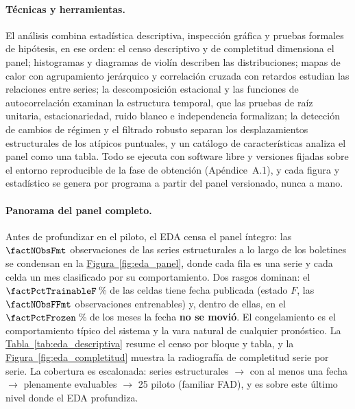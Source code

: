 \documentclass[12pt,letterpaper]{report}
\begin{document}
\paragraph{Técnicas y herramientas.} El análisis combina estadística descriptiva,
inspección gráfica y pruebas formales de hipótesis, en ese orden: el censo descriptivo y de
completitud dimensiona el panel; histogramas y diagramas de violín describen las distribuciones;
mapas de calor con agrupamiento jerárquico y correlación cruzada con retardos estudian las
relaciones entre series; la descomposición estacional y las funciones de autocorrelación examinan
la estructura temporal, que las pruebas de raíz unitaria, estacionariedad, ruido blanco e
independencia formalizan; la detección de cambios de régimen y el filtrado robusto separan los
desplazamientos estructurales de los atípicos puntuales, y un catálogo de características analiza
el panel como una tabla. Todo se ejecuta con software libre y versiones fijadas sobre el entorno
reproducible de la fase de obtención (Apéndice~A.1), y cada figura y estadístico se genera por
programa a partir del panel versionado, nunca a mano.

\paragraph{Panorama del panel completo.} Antes de profundizar en el piloto, el EDA
censa el panel íntegro: las $\factNObsFmt$ observaciones de las \factNSeriesStructural{} series estructurales
a lo largo de los \factNMonths{} boletines se condensan en la \hyperref[fig:eda_panel]{Figura~\ref*{fig:eda_panel}}, donde
cada fila es una serie y cada celda un mes clasificado por su comportamiento. Dos
rasgos dominan: el $\factPctTrainableF$\,\% de las celdas tiene fecha publicada (estado $F$, las
$\factNObsFFmt$ observaciones entrenables) y, dentro de ellas, en el $\factPctFrozen$\,\% de los meses
la fecha \textbf{no se movió}. El congelamiento es el comportamiento típico del
sistema y la vara natural de cualquier pronóstico. La \hyperref[tab:eda_descriptiva]{Tabla~\ref*{tab:eda_descriptiva}}
resume el censo por bloque y tabla, y la \hyperref[fig:eda_completitud]{Figura~\ref*{fig:eda_completitud}} muestra la
radiografía de completitud serie por serie. La cobertura es escalonada: \factNSeriesStructural{} series
estructurales $\rightarrow$ \factNSeriesWithF{} con al menos una fecha $\rightarrow$ \factNSeriesEvaluable{} plenamente
evaluables $\rightarrow$ 25 piloto (familiar FAD), y es sobre este último nivel donde
el EDA profundiza.
\end{document}
